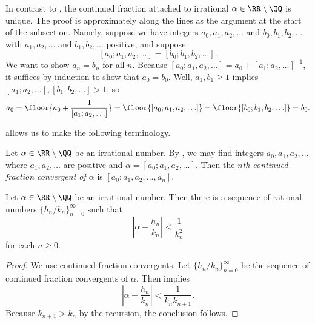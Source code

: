 \documentclass[../notes.tex]{subfiles}
\begin{document}
\begin{remark} \label{rem:inf-cf-uniq}
	In contrast to , the continued fraction attached to irrational $\alpha\in\RR\setminus\QQ$ is unique. The proof is approximately along the lines as the argument at the start of the subsection. Namely, suppose we have integers $a_0,a_1,a_2,\ldots$ and $b_0,b_1,b_2,\ldots$ with $a_1,a_2,\ldots$ and $b_1,b_2,\ldots$ positive, and suppose
	\[[a_0;a_1,a_2,\ldots]=[b_0;b_1,b_2,\ldots].\]
	We want to show $a_n=b_n$ for all $n$. Because $[a_0;a_1,a_2,\ldots]=a_0+[a_1;a_2,\ldots]^{-1}$, it suffices by induction to show that $a_0=b_0$.
	Well, $a_1,b_1\ge1$ implies $[a_1;a_2,\ldots],[b_1,b_2,\ldots]>1$, so
	\[a_0=\floor{a_0+\frac1{[a_1;a_2,\ldots]}}=\floor{[a_0;a_1,a_2,\ldots]}=\floor{[b_0;b_1,b_2,\ldots]}=b_0.\]
\end{remark}
 allows us to make the following terminology.
\begin{definition}[convergent]
	Let $\alpha\in\RR\setminus\QQ$ be an irrational number. By , we may find integers $a_0,a_1,a_2,\ldots$ where $a_1,a_2,\ldots$ are positive and $\alpha=[a_0;a_1,a_2,\ldots]$. Then the \textit{$n$th continued fraction convergent of $\alpha$} is $[a_0;a_1,a_2,\ldots,a_n]$.
\end{definition}
\begin{corollary} \label{cor:cf-gives-rat-approx}
	Let $\alpha\in\RR\setminus\QQ$ be an irrational number. Then there is a sequence of rational numbers $\{h_n/k_n\}_{n=0}^\infty$ such that
	\[\left|\alpha-\frac{h_n}{k_n}\right|<\frac1{k_n^2}\]
	for each $n\ge0$.
\end{corollary}
\begin{proof}
	We use continued fraction convergents. Let $\{h_n/k_n\}_{n=0}^\infty$ be the sequence of continued fraction convergents of $\alpha$. Then  implies
	\[\left|\alpha-\frac{h_n}{k_n}\right|<\frac1{k_nk_{n+1}}.\]
	Because $k_{n+1}>k_n$ by the recursion, the conclusion follows.
\end{proof}
\end{document}
